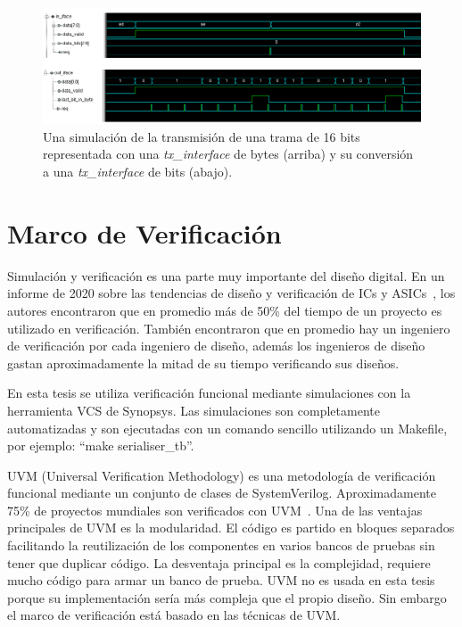 \documentclass[a4paper, twoside, 11pt]{report}
\begin{document}
\begin{figure}[htb]
  \centering
  \includegraphics[width=1.0\textwidth]{./img/tx_iface_example}
  \caption{Una simulación de la transmisión de una trama de 16 bits representada con una \textit{tx\_interface} de bytes (arriba) y su conversión a una \textit{tx\_interface} de bits (abajo).}
  \label{fig:tx_iface}
\end{figure}


\FloatBarrier
\section{Marco de Verificación}

Simulación y verificación es una parte muy importante del diseño digital. En un informe de 2020 sobre las tendencias de diseño y verificación de ICs y ASICs~\cite{verification_trends_2020}, los autores encontraron que en promedio más de 50\% del tiempo de un proyecto es utilizado en verificación. También encontraron que en promedio hay un ingeniero de verificación por cada ingeniero de diseño, además los ingenieros de diseño gastan aproximadamente la mitad de su tiempo verificando sus diseños.

En esta tesis se utiliza verificación funcional mediante simulaciones con la herramienta VCS de Synopsys. Las simulaciones son completamente automatizadas y son ejecutadas con un comando sencillo utilizando un Makefile, por ejemplo: “make serialiser\_tb”.

UVM (Universal Verification Methodology) es una metodología de verificación funcional mediante un conjunto de clases de SystemVerilog. Aproximadamente 75\% de proyectos mundiales son verificados con UVM~\cite{verification_trends_2020}. Una de las ventajas principales de UVM es la modularidad. El código es partido en bloques separados facilitando la reutilización de los componentes en varios bancos de pruebas sin tener que duplicar código. La desventaja principal es la complejidad, requiere mucho código para armar un banco de prueba. UVM no es usada en esta tesis porque su implementación sería más compleja que el propio diseño. Sin embargo el marco de verificación está basado en las técnicas de UVM.
\end{document}
